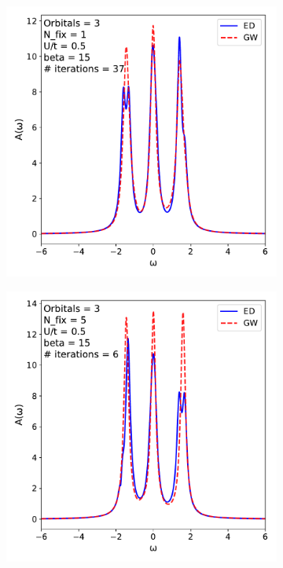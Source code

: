 \documentclass[12pt]{article}
\begin{document}
\begin{figure}[h!]
\begin{subfigure}[b]{0.45\textwidth}
  \end{subfigure}
  \hspace{0.05\textwidth}
    \begin{subfigure}[b]{0.45\textwidth}
    \includegraphics[width=\textwidth]{specgw31.pdf}
  \end{subfigure}
  \hspace{0.02\textwidth}
  \begin{subfigure}[b]{0.45\textwidth}
    \includegraphics[width=\textwidth]{specgw35.pdf}
  \end{subfigure}
\end{figure}
\end{document}
